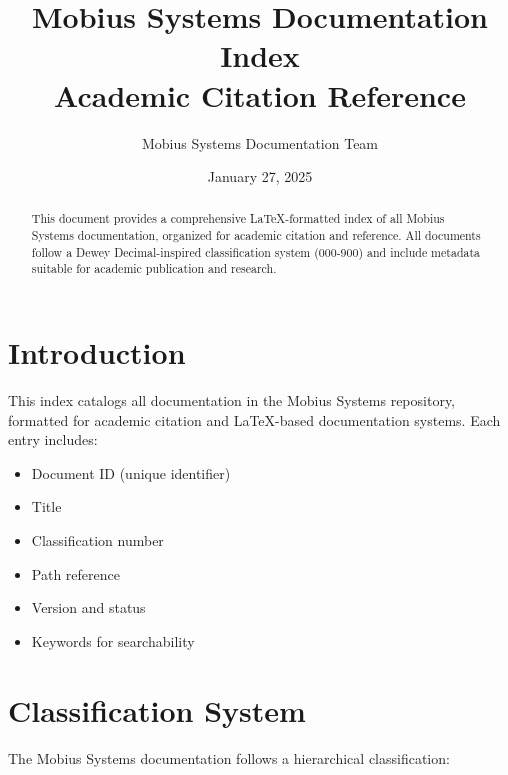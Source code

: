 \documentclass[11pt,a4paper]{article}
\title{Mobius Systems Documentation Index\\
\large{Academic Citation Reference}}
\author{Mobius Systems Documentation Team}
\date{January 27, 2025}
\begin{document}
\maketitle

\begin{abstract}
This document provides a comprehensive LaTeX-formatted index of all Mobius Systems documentation, organized for academic citation and reference. All documents follow a Dewey Decimal-inspired classification system (000-900) and include metadata suitable for academic publication and research.
\end{abstract}

\tableofcontents
\newpage

\section{Introduction}

This index catalogs all documentation in the Mobius Systems repository, formatted for academic citation and LaTeX-based documentation systems. Each entry includes:

\begin{itemize}
    \item Document ID (unique identifier)
    \item Title
    \item Classification number
    \item Path reference
    \item Version and status
    \item Keywords for searchability
\end{itemize}

\section{Classification System}

The Mobius Systems documentation follows a hierarchical classification:
\end{document}
